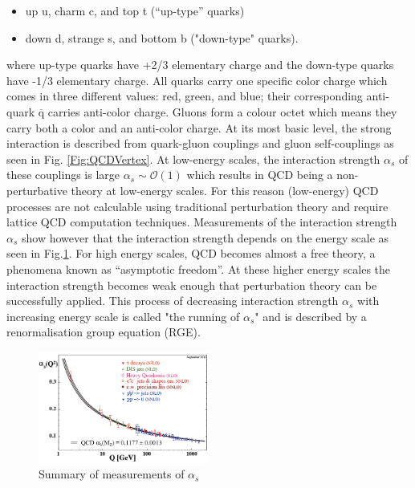 \begin{itemize}
    \item up u, charm c, and top t (“up-type” quarks)
    \item down d, strange s, and bottom b ("down-type" quarks).
\end{itemize}
where up-type quarks have +2/3 elementary charge and the down-type quarks have -1/3 elementary charge. All quarks carry one specific color charge which comes in three different values: red, green, and blue; their corresponding anti-quark $\overline{\text{q}}$ carries anti-color charge. Gluons form a colour octet which means they carry both a color and an anti-color charge. At its most basic level, the strong interaction is described from quark-gluon couplings and gluon self-couplings as seen in Fig. \ref{Fig:QCDVertex}. At low-energy scales, the interaction strength $\alpha_s$ of these couplings is large $\alpha_s \sim \mathcal{O}(1)$ which results in QCD being a non-perturbative theory at low-energy scales. For this reason (low-energy) QCD processes are not calculable using traditional perturbation theory and require lattice QCD computation techniques. Measurements of the interaction strength $\alpha_s$ show however that the interaction strength depends on the energy scale as seen in Fig.\ref{Fig:interaction strength}. For high energy scales, QCD becomes almost a free theory, a phenomena known as “asymptotic freedom”. At these higher energy scales the interaction strength becomes weak enough that perturbation theory can be successfully applied. This process of decreasing interaction strength $\alpha_s$ with increasing energy scale is called "the running of $\alpha_s$" and is described by a renormalisation group equation (RGE).
\begin{figure}
    \centering
    \includegraphics[width=0.5\textwidth]{Figures/Summary-of-measurements-of-a-s-as-a-function-of-the-energy-scale-Q-The-respective-degree.png}
    \caption{Summary of measurements of $\alpha_s$\cite{2015}}
    \label{Fig:interaction strength}
\end{figure}


